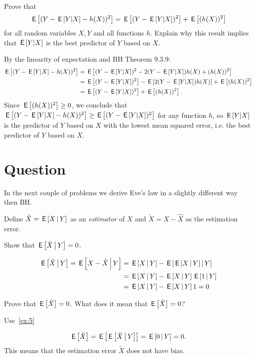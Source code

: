 \begin{exercise}
Prove that
\begin{equation}
  \label{eq:21}
\E{(Y - \E{Y|X} - h(X))^2} = \E{(Y - \E{Y|X})^2} + \E{(h(X))^2}
\end{equation}
for all random variables $X, Y$ and all functions $h$. Explain why this result implies that  $\,\mathsf{E}\left[Y|X\right]$ is the best predictor of $Y$ based on $X$.
\begin{solution}
By the linearity of expectation and BH Theorem 9.3.9:
\begin{align*}
\,\mathsf{E}\left[(Y - \,\mathsf{E}\left[Y|X\right] - h(X))^2\right] &= \,\mathsf{E}\left[(Y - \,\mathsf{E}\left[Y|X\right])^2 - 2(Y - \,\mathsf{E}\left[Y|X\right])h(X) + (h(X))^2\right]
\\ &= \,\mathsf{E}\left[(Y - \,\mathsf{E}\left[Y|X\right])^2\right] - \,\mathsf{E}\left[2(Y - \,\mathsf{E}\left[Y|X\right])h(X)\right] + \,\mathsf{E}\left[(h(X))^2\right]
\\ &= \,\mathsf{E}\left[(Y - \,\mathsf{E}\left[Y|X\right])^2\right] + \,\mathsf{E}\left[(h(X))^2\right].
\end{align*}
Since $\,\mathsf{E}\left[(h(X))^2\right] \geq 0$, we conclude that $\,\mathsf{E}\left[(Y - \,\mathsf{E}\left[Y|X\right] - h(X))^2\right] \geq \,\mathsf{E}\left[(Y - \,\mathsf{E}\left[Y|X\right])^2\right]$ for any function $h$, so $\,\mathsf{E}\left[Y|X\right]$ is the predictor of $Y$ based on $X$ with the lowest mean squared error, i.e. the best predictor of $Y$ based on $X$.
\end{solution}
\end{exercise}


\section{Question}
In the next couple of problems we derive Eve's law in a slightly different way then BH.

Define $\hat X = \,\mathsf{E}\left[X\,\middle|\, Y\right]$ as an \emph{estimator} of $X$ and $\tilde X = X - \hat X$ as the estimation error.

\begin{exercise}\label{ex:5}
Show that $\,\mathsf{E}\left[\tilde X\,\middle|\, Y\right] = 0$.
\begin{solution}
\begin{align}
\label{eq:4}
\E{\tilde X \given Y} = \E{X - \hat X \given Y} &=
\E{X\given Y}  - \E{ \E{X\given Y}\given Y}  \\
&=\E{X\given Y}  -  \E{X\given Y}\E{1\given Y}  \\
&=\E{X\given Y}  -  \E{X\given Y}1 = 0
\end{align}
\end{solution}
\end{exercise}

\begin{exercise}\label{ex:4}
Prove that $\,\mathsf{E}\left[\tilde X\right] = 0$. What does it mean that $\,\mathsf{E}\left[\tilde X\right] =0$?
\begin{hint}
  Use~\cref{ex:5}
\end{hint}
\begin{solution}
\begin{equation}
\label{eq:5}
\E{\tilde X} = \E{\E{\tilde X\given Y}} = \E{ 0 \given Y} =0.
\end{equation}
This means that the estimation error $\tilde X$ does not have bias.
\end{solution}
\end{exercise}

